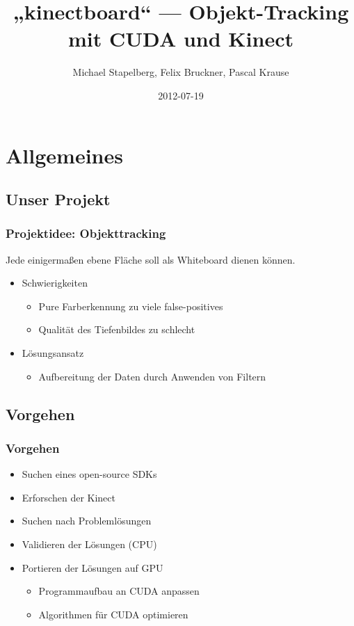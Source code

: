 \documentclass[compress]{beamer}
\title{„kinectboard“ — Objekt-Tracking\\mit CUDA und Kinect}
\author{Michael Stapelberg, Felix Bruckner, Pascal Krause}
\institute{Fakultät für Informatik\\
           Hochschule Mannheim\\}
\date{2012-07-19}
\begin{document}
\begin{frame}
\titlepage
\end{frame}

\begin{frame}
  \tableofcontents                       %
\end{frame}

\section{Allgemeines}
\subsection{Unser Projekt}
\begin{frame}
\frametitle{Projektidee: Objekttracking}

Jede einigermaßen ebene Fläche soll als Whiteboard dienen können.

\begin{itemize}
	\item Schwierigkeiten
	\begin{itemize}
		\item Pure Farberkennung zu viele false-positives
		\item Qualität des Tiefenbildes zu schlecht
	\end{itemize}
	\item Lösungsansatz
		\begin{itemize}
		\item Aufbereitung der Daten durch Anwenden von Filtern
	\end{itemize}
\end{itemize}
\end{frame}

\subsection{Vorgehen}

\begin{frame}
\frametitle{Vorgehen}

\begin{itemize}
	\item Suchen eines open-source SDKs
	\item Erforschen der Kinect
	\item Suchen nach Problemlösungen
	\item Validieren der Lösungen (CPU)
	\item Portieren der Lösungen auf GPU
	\begin{itemize}
		\item Programmaufbau an CUDA anpassen 
		\item Algorithmen für CUDA optimieren
	\end{itemize}
	
\end{itemize}
\end{frame}
\end{document}
